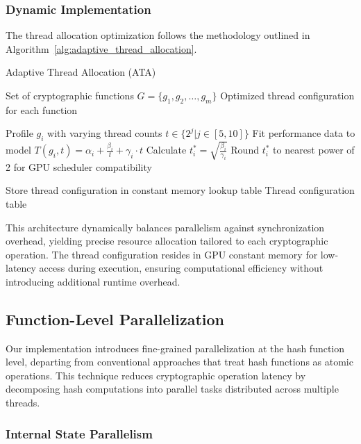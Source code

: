 \documentclass[journal]{IEEEtran}
\begin{document}
\subsubsection{Dynamic Implementation}

The thread allocation optimization follows the methodology outlined in Algorithm~\ref{alg:adaptive_thread_allocation}.

\begin{algorithm}
  \caption{Adaptive Thread Allocation (ATA)}
  \label{alg:adaptive_thread_allocation}
  \begin{algorithmic}[1]
    \REQUIRE Set of cryptographic functions $G = \{g_1, g_2, \ldots, g_m\}$
    \ENSURE Optimized thread configuration for each function

    \STATE Profile $g_i$ with varying thread counts $t \in \{2^j | j \in [5, 10]\}$
    \STATE Fit performance data to model $T(g_i, t) = \alpha_i + \frac{\beta_i}{t} + \gamma_i \cdot t$
    \STATE Calculate $t_i^* = \sqrt{\frac{\beta_i}{\gamma_i}}$
    \STATE Round $t_i^*$ to nearest power of 2 for GPU scheduler compatibility
    \ENDFOR

    \STATE Store thread configuration in constant memory lookup table
    \RETURN Thread configuration table
  \end{algorithmic}
\end{algorithm}

This architecture dynamically balances parallelism against synchronization overhead, yielding precise resource allocation tailored to each cryptographic operation. The thread configuration resides in GPU constant memory for low-latency access during execution, ensuring computational efficiency without introducing additional runtime overhead.

\color{black}

\subsection{Function-Level Parallelization}

Our implementation introduces fine-grained parallelization at the hash function level, departing from conventional approaches that treat hash functions as atomic operations. This technique reduces cryptographic operation latency by decomposing hash computations into parallel tasks distributed across multiple threads.

\subsubsection{Internal State Parallelism}
\end{document}
